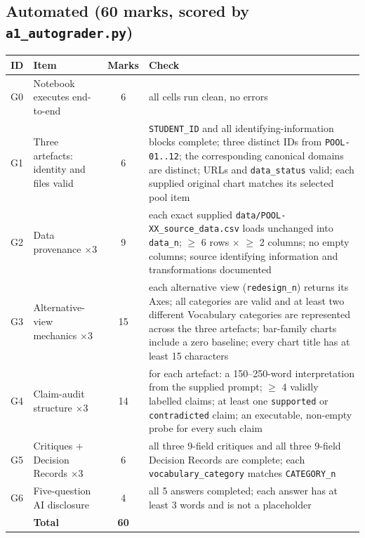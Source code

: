 \documentclass[11pt,a4paper]{article}
\newcommand{\labelbox}[1]{\colorbox{panel}{\texttt{\small #1}}}
\begin{document}
\subsection*{Automated (60 marks, scored by \texttt{a1\_autograder.py})}

\begin{tabularx}{\textwidth}{@{}l >{\raggedright\arraybackslash}p{4.1cm} c X@{}}
\toprule
\textbf{ID} & \textbf{Item} & \textbf{Marks} & \textbf{Check} \\
\midrule
G0 & Notebook executes end-to-end & 6 & all cells run clean, no errors \\
\addlinespace[0.35em]
G1 & Three artefacts: identity and files valid & 6 & \labelbox{STUDENT\_ID} and all identifying-information blocks complete; three distinct IDs from \labelbox{POOL-01..12}; the corresponding canonical domains are distinct; URLs and \labelbox{data\_status} valid; each supplied original chart matches its selected pool item \\
\addlinespace[0.35em]
G2 & Data provenance $\times$3 & 9 & each exact supplied \labelbox{data/POOL-XX\_source\_data.csv} loads unchanged into \labelbox{data\_n}; $\geq$ 6 rows $\times$ $\geq$ 2 columns; no empty columns; source identifying information and transformations documented \\
\addlinespace[0.35em]
G3 & Alternative-view mechanics $\times$3 & 15 & each alternative view (\labelbox{redesign\_n}) returns its Axes; all categories are valid and at least two different Vocabulary categories are represented across the three artefacts; bar-family charts include a zero baseline; every chart title has at least 15 characters \\
\addlinespace[0.35em]
G4 & Claim-audit structure $\times3$ & 14 & for each artefact: a 150--250-word interpretation from the supplied prompt; $\geq$ 4 validly labelled claims; at least one \labelbox{supported} or \labelbox{contradicted} claim; an executable, non-empty probe for every such claim \\
\addlinespace[0.35em]
G5 & Critiques + Decision Records $\times3$ & 6 & all three 9-field critiques and all three 9-field Decision Records are complete; each \labelbox{vocabulary\_category} matches \labelbox{CATEGORY\_n} \\
\addlinespace[0.35em]
G6 & Five-question AI disclosure & 4 & all 5 answers completed; each answer has at least 3 words and is not a placeholder \\
\midrule
 & \textbf{Total} & \textbf{60} & \\
\bottomrule
\end{tabularx}
\end{document}
